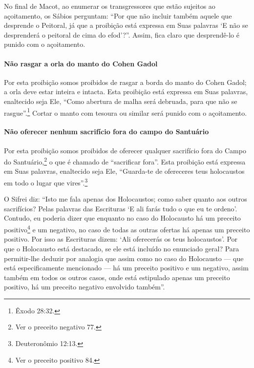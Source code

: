 No final de Macot, ao enumerar os transgressores que estão sujeitos ao
açoitamento, os Sábios perguntam: ``Por que não incluir também aquele
que desprende o Peitoral, já que a proibição está expressa em Suas
palavras `E não se desprenderá o peitoral de cima do efod'?''. Assim,
fica claro que desprendê-lo é punido com o açoitamento.

\paragraph{Não rasgar a orla do manto do Cohen Gadol}

Por esta proibição somos proibidos de rasgar a borda do manto do Cohen
Gadol; a orla deve estar inteira e intacta. Esta proibição está
expressa em Suas palavras, enaltecido seja Ele, ``Como abertura de malha
será debruada, para que não se rasgue''.\footnote{Êxodo 28:32.} Cortar o manto
com tesoura ou similar será punido com o açoitamento.

\paragraph{Não oferecer nenhum sacrifício fora do campo do Santuário}

Por esta proibição somos proibidos de oferecer qualquer sacrifício fora
do Campo do Santuário,\footnote{Ver o preceito negativo 77.} o que é chamado de
``sacrificar fora''. Esta proibição está expressa em Suas palavras,
enaltecido seja Ele, ``Guarda-te de ofereceres teus holocaustos em todo
o lugar que vires''.\footnote{Deuteronômio 12:13.}

O Sifrei diz: ``Isto me fala apenas dos Holocaustos; como saber quanto
aos outros sacrifícios? Pelas palavras das Escrituras `E ali farás tudo
o que eu te ordeno'. Contudo, eu poderia dizer que enquanto no caso do
Holocausto há um preceito positivo\footnote{Ver o preceito positivo 84.} e um negativo,
no caso de todas as outras ofertas há apenas um preceito positivo. Por
isso as Escrituras dizem: `Ali oferecerás os teus holocaustos'. Por que
o Holocausto está destacado, se ele está incluído no enunciado geral?
Para permitir-lhe deduzir por analogia que assim como no caso do
Holocausto --- que está especificamente mencionado --- há um preceito
positivo e um negativo, assim também em todos os outros casos, onde está
estipulado apenas um preceito positivo, há um preceito negativo
envolvido também''.


